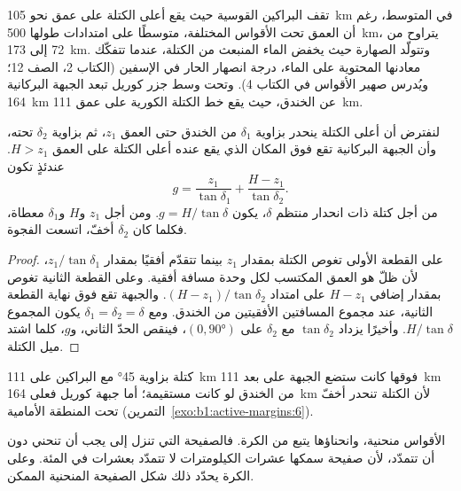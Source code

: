 تقف البراكين القوسية حيث يقع أعلى الكتلة على عمق نحو \qty{105}{km} في المتوسط، رغم أن العمق تحت الأقواس المختلفة، متوسطًا على امتدادات طولها \qty{500}{km}، يتراوح من 72 إلى \qty{173}{km}. وتتولّد الصهارة حيث يخفض الماء المنبعث من الكتلة، عندما تتفكّك معادنها المحتوية على الماء، درجة انصهار  الحار في الإسفين (الكتاب 2، الصف 12؛ ويُدرس صهير الأقواس في الكتاب 4). وتحت وسط جزر كوريل تبعد الجبهة البركانية \qty{164}{km} عن الخندق، حيث يقع خط الكتلة الكورية على عمق \qty{111}{km}.

\begin{proposition}\label{prop:b1:active-margins:gap}
لنفترض أن أعلى الكتلة ينحدر بزاوية $\delta_1$ من الخندق حتى العمق $z_1$، ثم بزاوية $\delta_2$ تحته، وأن الجبهة البركانية تقع فوق المكان الذي يقع عنده أعلى الكتلة على العمق $H > z_1$. عندئذٍ تكون 
\[
  g = \frac{z_1}{\tan\delta_1} + \frac{H - z_1}{\tan\delta_2} .
\]
من أجل كتلة ذات انحدار منتظم $\delta$، يكون $g = H/\tan\delta$. ومن أجل $z_1$ و$H$ و$\delta_1$ معطاة، فكلما كان  $\delta_2$ أخفّ، اتسعت الفجوة.
\end{proposition}

\begin{proof}
على القطعة الأولى تغوص الكتلة بمقدار $z_1$ بينما تتقدّم أفقيًا بمقدار $z_1/\tan\delta_1$، لأن ظلّ  هو العمق المكتسب لكل وحدة مسافة أفقية. وعلى القطعة الثانية تغوص بمقدار إضافي $H - z_1$ على امتداد $(H - z_1)/\tan\delta_2$. والجبهة تقع فوق نهاية القطعة الثانية، عند مجموع المسافتين الأفقيتين من الخندق. ومع $\delta_1 = \delta_2
= \delta$ يكون المجموع $H/\tan\delta$. وأخيرًا يزداد $\tan\delta_2$ مع $\delta_2$ على $(0, \ang{90})$، فينقص الحدّ الثاني، و$g$، كلما اشتد ميل الكتلة.
\end{proof}

كتلة بزاوية \ang{45} مع البراكين على \qty{111}{km} فوقها كانت ستضع الجبهة على بعد \qty{111}{km} من الخندق لو كانت مستقيمة؛ أما جبهة كوريل فعلى \qty{164}{km} لأن الكتلة تنحدر أخفّ تحت المنطقة الأمامية (التمرين~\ref{exo:b1:active-margins:6}).

الأقواس منحنية، وانحناؤها يتبع من الكرة. فالصفيحة التي تنزل إلى  يجب أن تنحني دون أن تتمدّد، لأن صفيحة سمكها عشرات الكيلومترات لا تتمدّد بعشرات في المئة. وعلى الكرة يحدّد ذلك شكل الصفيحة المنحنية الممكن.

